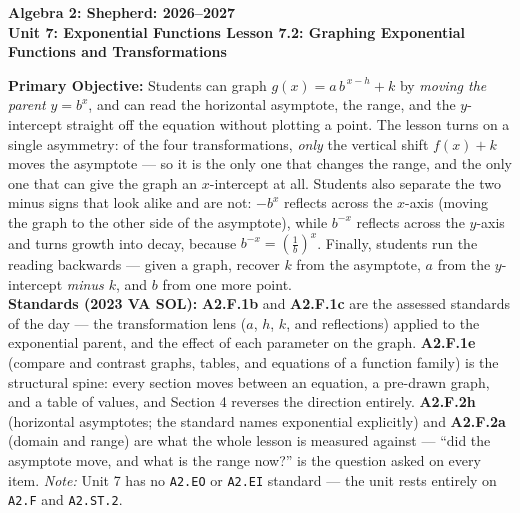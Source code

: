 \documentclass[10pt]{article}
\newcommand{\CourseName}{Algebra 2: Shepherd}
\newcommand{\SchoolYear}{2026--2027}
\newcommand{\UnitNumberName}{Unit 7: Exponential Functions \quad}
\newcommand{\LessonNumberName}{Lesson 7.2: Graphing Exponential Functions and Transformations}
\begin{document}
\begin{center}
    {\Large\bfseries \CourseName: \SchoolYear \\
    {\small\bfseries \UnitNumberName \LessonNumberName}}
\end{center}

\begin{tcolorbox}[colback=forestbg, colframe=forest, boxrule=0.9pt, arc=2mm,
    left=2mm, right=2mm, top=1.5mm, bottom=1.5mm]
    \textbf{Primary Objective:} Students can graph $g(x)=a\,b^{\,x-h}+k$ by \emph{moving the parent}
    $y=b^{x}$, and can read the horizontal asymptote, the range, and the $y$-intercept straight off
    the equation without plotting a point. The lesson turns on a single asymmetry: of the four
    transformations, \emph{only} the vertical shift $f(x)+k$ moves the asymptote --- so it is the only
    one that changes the range, and the only one that can give the graph an $x$-intercept at all.
    Students also separate the two minus signs that look alike and are not: $-b^{x}$ reflects across
    the $x$-axis (moving the graph to the other side of the asymptote), while $b^{-x}$ reflects
    across the $y$-axis and turns growth into decay, because $b^{-x}=\left(\frac1b\right)^{x}$.
    Finally, students run the reading backwards --- given a graph, recover $k$ from the asymptote, $a$
    from the $y$-intercept \emph{minus $k$}, and $b$ from one more point.
    \\[2pt]
    \textbf{Standards (2023 VA SOL):} \textbf{A2.F.1b} and \textbf{A2.F.1c} are the assessed standards
    of the day --- the transformation lens ($a$, $h$, $k$, and reflections) applied to the exponential
    parent, and the effect of each parameter on the graph. \textbf{A2.F.1e} (compare and contrast
    graphs, tables, and equations of a function family) is the structural spine: every section moves
    between an equation, a pre-drawn graph, and a table of values, and Section 4 reverses the
    direction entirely. \textbf{A2.F.2h} (horizontal asymptotes; the standard names exponential
    explicitly) and \textbf{A2.F.2a} (domain and range) are what the whole lesson is measured
    against --- ``did the asymptote move, and what is the range now?'' is the question asked on every
    item. \emph{Note:} Unit 7 has no \texttt{A2.EO} or \texttt{A2.EI} standard --- the unit rests
    entirely on \texttt{A2.F} and \texttt{A2.ST.2}.
\end{tcolorbox}
\end{document}
